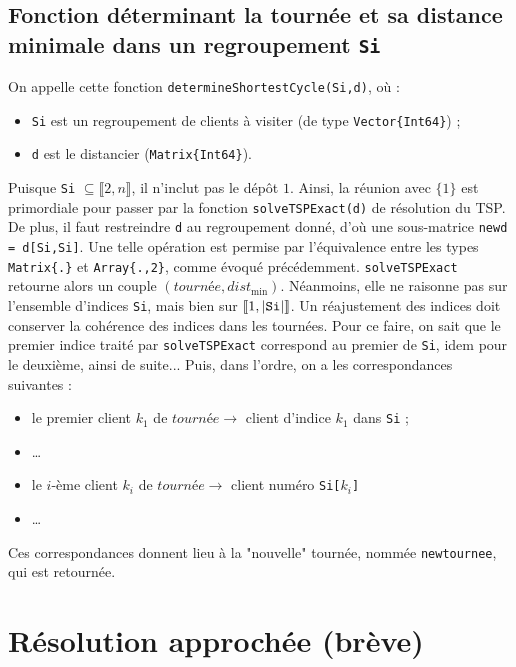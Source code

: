 \documentclass[french, 11pt, a4paper]{article} %
\newcommand{\smb}{\smallbreak}
\begin{document}
\subsection{Fonction déterminant la tournée et sa distance minimale dans un regroupement \texttt{Si}}
On appelle cette fonction \texttt{determineShortestCycle(Si,d)}, où : 
\begin{itemize}
    \item \verb+Si+ est un regroupement de clients à visiter (de type \verb+Vector{Int64}+) ;
    \item \verb+d+ est le distancier (\verb+Matrix{Int64}+).
\end{itemize}
\smb Puisque \verb+Si+ $\subseteq \llbracket 2,n \rrbracket$, il n'inclut pas le dépôt $1$. Ainsi, la réunion avec $\{1\}$
est primordiale pour passer par la fonction \verb+solveTSPExact(d)+ de résolution du TSP.
\smb De plus, il faut restreindre \verb+d+ au regroupement donné, d'où une sous-matrice
\verb+newd = d[Si,Si]+. Une telle opération est permise par l'équivalence entre les types
\verb+Matrix{.}+ et \verb+Array{.,2}+, comme évoqué précédemment.
\smb \verb+solveTSPExact+ retourne alors un couple $(tourn\text{é}e,dist_{\text{min}})$. Néanmoins, elle ne raisonne pas sur l'ensemble d'indices \verb+Si+, mais bien sur
$\llbracket 1,|\text{\texttt{Si}}| \rrbracket$. 
\smb Un réajustement des indices doit conserver la cohérence
des indices dans les tournées. Pour ce faire, on sait que le premier indice traité par \verb+solveTSPExact+ correspond au premier de \verb+Si+,
idem pour le deuxième, ainsi de suite... Puis, dans l'ordre, on a les correspondances suivantes :
\begin{itemize}
    \item le premier client $k_1$ de $tourn\text{é}e \longrightarrow$ client d'indice $k_1$ dans \verb+Si+ ;
    \item \dots
    \item le $i$-ème client $k_i$ de $tourn\text{é}e \longrightarrow$ client numéro \verb+Si[+$k_i$\verb+]+
    \item \dots
\end{itemize}

Ces correspondances donnent lieu à la "nouvelle" tournée, nommée \verb+newtournee+, qui est retournée.

\section{Résolution approchée (brève)}
\end{document}
